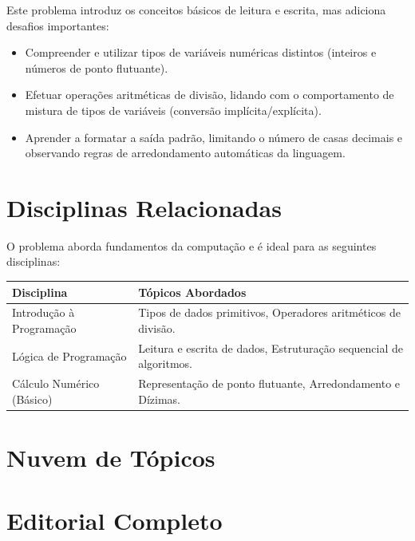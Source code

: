 \documentclass{article}
\begin{document}

\begin{objetivobox}
Este problema introduz os conceitos básicos de leitura e escrita, mas adiciona desafios importantes:
\begin{itemize}
    \item Compreender e utilizar tipos de variáveis numéricas distintos (inteiros e números de ponto flutuante).
    \item Efetuar operações aritméticas de divisão, lidando com o comportamento de mistura de tipos de variáveis (conversão implícita/explícita).
    \item Aprender a formatar a saída padrão, limitando o número de casas decimais e observando regras de arredondamento automáticas da linguagem.
\end{itemize}
\end{objetivobox}

\section{Disciplinas Relacionadas}

O problema aborda fundamentos da computação e é ideal para as seguintes disciplinas:

\vspace{1em}
\begin{tabularx}{\textwidth}{@{} l X @{}}
\toprule
\textbf{Disciplina} & \textbf{Tópicos Abordados} \\
\midrule
Introdução à Programação & Tipos de dados primitivos, Operadores aritméticos de divisão. \\
Lógica de Programação & Leitura e escrita de dados, Estruturação sequencial de algoritmos. \\
Cálculo Numérico (Básico) & Representação de ponto flutuante, Arredondamento e Dízimas. \\
\bottomrule
\end{tabularx}
\vspace{1em}

\section{Nuvem de Tópicos}


\section{Editorial Completo}
\end{document}
